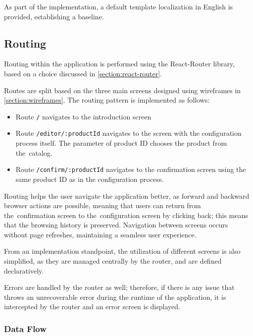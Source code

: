As part of the implementation, a default template localization in English is provided, establishing a baseline.


\subsection{Routing}

Routing within the application is performed using the React-Router library, based on a choice discussed in \autoref{section:react-router}.

Routes are split based on the three main screens designed using wireframes in \autoref{section:wireframes}. The routing pattern is implemented as follows:

\begin{itemize}[label=\rectanglebullet]
    \item Route \texttt{/} navigates to the introduction screen
    \item Route \texttt{/editor/:productId} navigates to the screen with the configuration process itself. The parameter of product ID chooses the product from the~catalog.
    \item Route \texttt{/confirm/:productId} navigates to the confirmation screen using the same product ID as in the configuration process.
\end{itemize}

Routing helps the user navigate the application better, as forward and backward browser actions are possible, meaning that users can return from the~confirmation screen to the~configuration screen by clicking back; this means that the browsing history is preserved. Navigation between screens occurs without page refreshes, maintaining a seamless user experience.

From an implementation standpoint, the utilization of different screens is also simplified, as they are managed centrally by the router, and are defined declaratively. 

Errors are handled by the router as well; therefore, if there is any issue that throws an unrecoverable error during the runtime of the application, it is intercepted by the router and an error screen is displayed.


\subsubsection{Data Flow}

